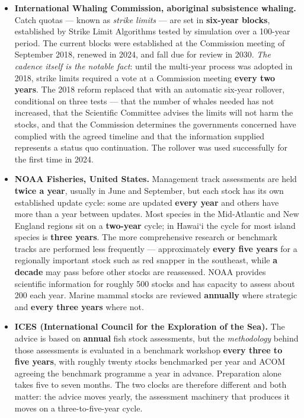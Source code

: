 \begin{itemize}

\item \textbf{International Whaling Commission, aboriginal subsistence whaling.}
Catch quotas --- known as \emph{strike limits} --- are set in \textbf{six-year blocks},
established by Strike Limit Algorithms tested by simulation over a 100-year period. The
current blocks were established at the Commission meeting of September 2018, renewed in
2024, and fall due for review in 2030. \emph{The cadence itself is the notable fact}: until
the multi-year process was adopted in 2018, strike limits required a vote at a Commission
meeting \textbf{every two years}. The 2018 reform replaced that with an automatic six-year
rollover, conditional on three tests --- that the number of whales needed has not
increased, that the Scientific Committee advises the limits will not harm the stocks, and
that the Commission determines the governments concerned have complied with the agreed
timeline and that the information supplied represents a status quo continuation. The
rollover was used successfully for the first time in 2024.

\item \textbf{NOAA Fisheries, United States.} Management track assessments are held
\textbf{twice a year}, usually in June and September, but each stock has its own
established update cycle: some are updated \textbf{every year} and others have more than a
year between updates. Most species in the Mid-Atlantic and New England regions sit on a
\textbf{two-year} cycle; in Hawai`i the cycle for most island species is \textbf{three
years}. The more comprehensive research or benchmark tracks are performed less frequently
--- approximately \textbf{every five years} for a regionally important stock such as red
snapper in the southeast, while \textbf{a decade} may pass before other stocks are
reassessed. NOAA provides scientific information for roughly 500 stocks and has capacity to
assess about 200 each year. Marine mammal stocks are reviewed \textbf{annually} where
strategic and \textbf{every three years} where not.

\item \textbf{ICES (International Council for the Exploration of the Sea).} The advice is
based on \textbf{annual} fish stock assessments, but the \emph{methodology} behind those
assessments is evaluated in a benchmark workshop \textbf{every three to five years}, with
roughly twenty stocks benchmarked per year and ACOM agreeing the benchmark programme a year
in advance. Preparation alone takes five to seven months. The two clocks are therefore
different and both matter: the advice moves yearly, the assessment machinery that produces
it moves on a three-to-five-year cycle.


\end{itemize}
